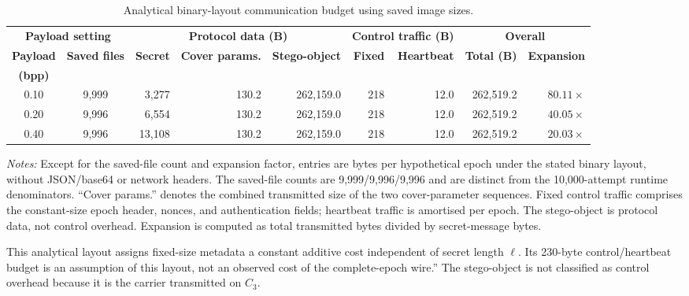 \documentclass[journal]{IEEEtran}
\renewcommand{\arraystretch}{1.2}
\renewcommand{\arraystretch}{1.0}
\theoremstyle{definition}
\theoremstyle{game}
\renewcommand{\arraystretch}{1.5}
\begin{document}
\begin{table}[!t]
\centering
\caption[Per-epoch communication accounting across payloads.]
{Analytical binary-layout communication budget using saved image sizes.}
\label{tab:qim_v32_overhead}
\small
\setlength{\tabcolsep}{4.4pt}
\renewcommand{\arraystretch}{1.15}
\begin{threeparttable}
\begin{tabular}{@{}ccrrrrrrr@{}}
\toprule
\multicolumn{2}{c}{\textbf{Payload setting}} &
\multicolumn{3}{c}{\textbf{Protocol data (B)}} &
\multicolumn{2}{c}{\textbf{Control traffic (B)}} &
\multicolumn{2}{c}{\textbf{Overall}} \\
\cmidrule(lr){1-2}
\cmidrule(lr){3-5}
\cmidrule(lr){6-7}
\cmidrule(l){8-9}
\textbf{Payload} &
\textbf{Saved files} &
\textbf{Secret} &
\textbf{Cover params.} &
\textbf{Stego-object} &
\textbf{Fixed} &
\textbf{Heartbeat} &
\textbf{Total (B)} &
\textbf{Expansion} \\
\textbf{(bpp)} &
{} &
{} &
{} &
{} &
{} &
{} &
{} &
{} \\
\midrule
0.10 & 9,999 &  3,277 & 130.2 & 262,159.0 & 218 & 12.0 & 262,519.2 & $80.11\times$ \\
0.20 & 9,996 &  6,554 & 130.2 & 262,159.0 & 218 & 12.0 & 262,519.2 & $40.05\times$ \\
0.40 & 9,996 & 13,108 & 130.2 & 262,159.0 & 218 & 12.0 & 262,519.2 & $20.03\times$ \\
\bottomrule
\end{tabular}
\begin{tablenotes}
\footnotesize
\item \textit{Notes:} Except for the saved-file count and expansion factor, entries are bytes per
hypothetical epoch under the stated binary layout, without JSON/base64 or
network headers. The saved-file counts are 9,999/9,996/9,996 and are
distinct from the 10,000-attempt runtime denominators. ``Cover params.'' denotes the combined transmitted size of the two cover-parameter sequences. Fixed control traffic comprises the constant-size epoch header, nonces, and authentication fields; heartbeat traffic is amortised per epoch. The stego-object is protocol data, not control overhead. Expansion is computed as total transmitted bytes divided by secret-message bytes.
\end{tablenotes}
\end{threeparttable}
\end{table}
This analytical layout assigns fixed-size metadata a constant additive
cost independent of secret length $\ell$. Its 230-byte control/heartbeat
budget is an assumption of this layout, not an observed cost of the
complete-epoch wire.'' The stego-object is
not classified as control overhead because it is the carrier
transmitted on $C_3$.
\end{document}
